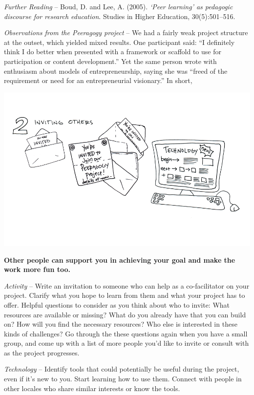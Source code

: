\emph{Further Reading} -- Boud, D. and Lee, A. (2005). \emph{`Peer
learning' as pedagogic discourse for research education}. Studies in
Higher Education, 30(5):501--516.

\emph{Observations from the Peeragogy project} -- We had a fairly weak
project structure at the outset, which yielded mixed results. One
participant said: ``I definitely think I do better when presented with a
framework or scaffold to use for participation or content development.''
Yet the same person wrote with enthusiasm about models of
entrepreneurship, saying she was ``freed of the requirement or need for
an entrepreneurial visionary.'' In short,

\begin{center}
\includegraphics{../pictures/OpenBook-2-2.jpg}
\end{center}

\textbf{Other people can support you in achieving your goal and make the
work more fun too.}

\emph{Activity} -- Write an invitation to someone who can help as a
co-facilitator on your project. Clarify what you hope to learn from them
and what your project has to offer. Helpful questions to consider as you
think about who to invite: What resources are available or missing? What
do you already have that you can build on? How will you find the
necessary resources? Who else is interested in these kinds of
challenges? Go through the these questions again when you have a small
group, and come up with a list of more people you'd like to invite or
consult with as the project progresses.

\emph{Technology} -- Identify tools that could potentially be useful
during the project, even if it's new to you. Start learning how to use
them. Connect with people in other locales who share similar interests
or know the tools.

